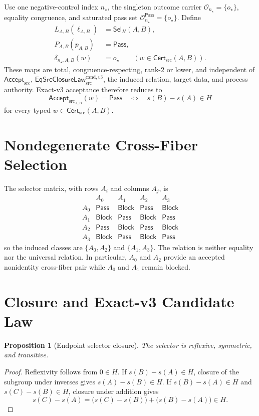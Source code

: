 \documentclass[11pt]{article}
\newtheorem{proposition}{Proposition}
\newcommand{\Cert}{\mathsf{Cert}_{\mathrm{src}}}
\newcommand{\Accept}{\mathsf{Accept}_{\mathrm{src}}}
\newcommand{\Law}{\mathsf{EqSrcClosureLaw}^{\mathrm{cand},v3}_{\mathrm{src}}}
\newcommand{\Pass}{\mathsf{Pass}}
\newcommand{\Block}{\mathsf{Block}}
\newcommand{\Sel}{\mathsf{Sel}_{H}}
\begin{document}
Use one negative-control index \(n_\star\), the singleton outcome carrier
\(\mathcal O_{n_\star}=\{o_\star\}\), equality congruence, and saturated pass
set \(\mathcal O_{n_\star}^{\Pass}=\{o_\star\}\). Define
\[
\begin{aligned}
 L_{A,B}(\ell_{A,B})&=\Sel(A,B),\\
 P_{A,B}(p_{A,B})&=\Pass,\\
 \delta_{n_\star,A,B}(w)&=o_\star
 \qquad(w\in\Cert(A,B)).
\end{aligned}
\]
These maps are total, congruence-respecting, rank-2 or lower, and independent
of \(\Accept\), \(\Law\), the induced relation, target data, and process
authority. Exact-v3 acceptance therefore reduces to
\[
 \Accept_{A,B}(w)=\Pass
 \quad\Longleftrightarrow\quad
 s(B)-s(A)\in H
\]
for every typed \(w\in\Cert(A,B)\).

\section{Nondegenerate Cross-Fiber Selection}

The selector matrix, with rows \(A_i\) and columns \(A_j\), is
\[
\begin{array}{c|cccc}
 &A_0&A_1&A_2&A_3\\\hline
A_0&\Pass&\Block&\Pass&\Block\\
A_1&\Block&\Pass&\Block&\Pass\\
A_2&\Pass&\Block&\Pass&\Block\\
A_3&\Block&\Pass&\Block&\Pass
\end{array}
\]
so the induced classes are
\(\{A_0,A_2\}\) and \(\{A_1,A_3\}\). The relation is neither equality nor the
universal relation. In particular, \(A_0\) and \(A_2\) provide an accepted
nonidentity cross-fiber pair while \(A_0\) and \(A_1\) remain blocked.

\section{Closure and Exact-v3 Candidate Law}

\begin{proposition}[Endpoint selector closure]
The selector is reflexive, symmetric, and transitive.
\end{proposition}

\begin{proof}
Reflexivity follows from \(0\in H\). If \(s(B)-s(A)\in H\), closure of the
subgroup under inverses gives \(s(A)-s(B)\in H\). If
\(s(B)-s(A)\in H\) and \(s(C)-s(B)\in H\), closure under addition gives
\[
 s(C)-s(A)=\bigl(s(C)-s(B)\bigr)+\bigl(s(B)-s(A)\bigr)\in H.
\]
\end{proof}
\end{document}
